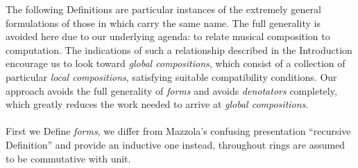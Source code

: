 The following Definitions are particular instances of the extremely general formulations of those in \cite{Mazzola} which carry the same name. The full generality is avoided here due to our underlying agenda: to relate musical composition to computation. The indications of such a relationship described in the Introduction encourage us to look toward \emph{global compositions}, which consist of a collection of particular \emph{local compositions}, satisfying suitable compatibility conditions. Our approach avoids the full generality of \emph{forms} and avoids \emph{denotators} completely, which greatly reduces the work needed to arrive at \emph{global compositions}.\\\\
%
First we Define \emph{forms}, we differ from Mazzola's confusing presentation ``recursive Definition'' and provide an inductive one instead, throughout rings are assumed to be commutative with unit.
